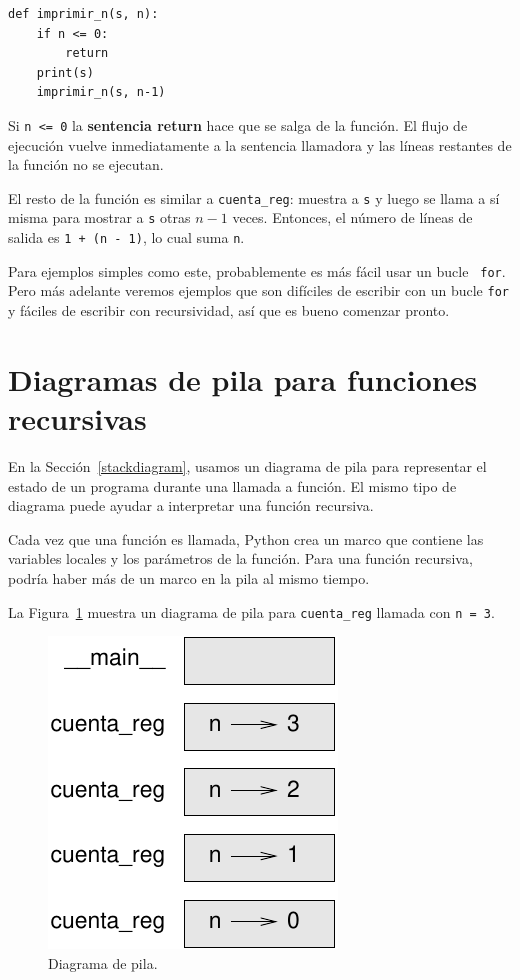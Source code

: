 \documentclass[10pt]{book}
\begin{document}
\begin{verbatim}
def imprimir_n(s, n):
    if n <= 0:
        return
    print(s)
    imprimir_n(s, n-1)
\end{verbatim}
%
Si {\tt n <= 0} la {\bf sentencia return} hace que se salga de la función.  El
flujo de ejecución vuelve inmediatamente a la sentencia llamadora y las líneas restantes
de la función no se ejecutan.

El resto de la función es similar a {\tt cuenta\_reg}: muestra a
{\tt s} y luego se llama a sí misma para mostrar a {\tt s} otras $n-1$
veces.  Entonces, el número de líneas de salida es {\tt 1 + (n - 1)}, lo cual
suma {\tt n}.

Para ejemplos simples como este, probablemente es más fácil usar un bucle {\tt
for}.  Pero más adelante veremos ejemplos que son difíciles de escribir
con un bucle {\tt for} y fáciles de escribir con recursividad, así que es
bueno comenzar pronto.


\section{Diagramas de pila para funciones recursivas}
\label{recursive.stack}

En la Sección~\ref{stackdiagram}, usamos un diagrama de pila para representar
el estado de un programa durante una llamada a función.  El mismo tipo de
diagrama puede ayudar a interpretar una función recursiva.

Cada vez que una función es llamada, Python crea un
marco que contiene las variables locales y los parámetros de la función.
Para una función recursiva, podría haber más de un marco en la
pila al mismo tiempo.

La Figura~\ref{fig.stack2} muestra un diagrama de pila para {\tt cuenta\_reg} llamada con
{\tt n = 3}.

\begin{figure}
\centerline
{\includegraphics[scale=0.8]{figs/stack2.pdf}}
\caption{Diagrama de pila.}
\label{fig.stack2}
\end{figure}
\end{document}
